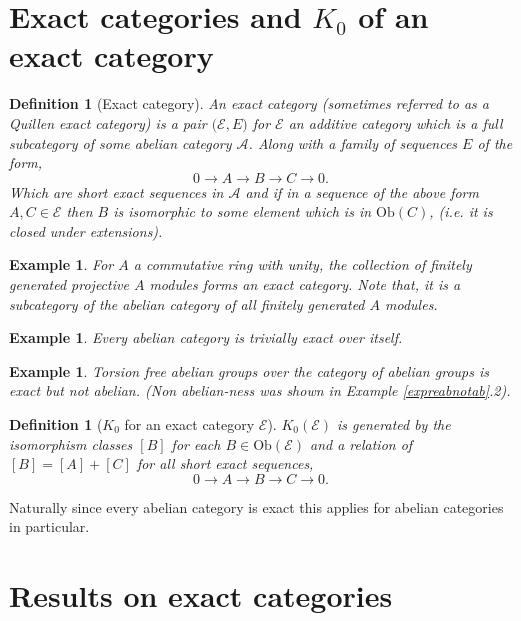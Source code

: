 \documentclass[12pt]{report}
\numberwithin{equation}{section}
\newtheorem{definition}[dummy]{Definition}
\newtheorem{example}[dummy]{Example}
\begin{document}
	\section{Exact categories and \( K_0 \) of an exact category}
	\begin{definition}[Exact category]\label{defexactcat}
			An exact category (sometimes referred to as a Quillen exact category) is a pair $\mathcal{(E},E)$ for $\mathcal{E}$ an additive category which is a full subcategory of some abelian category $\mathcal{A}$. Along with a family of sequences $E$ of the form, \[ 0 \to A \to B \to C \to 0. \] Which are short exact sequences in $\mathcal{A}$ and if in a sequence of the above form $A, C \in \mathcal{E}$ then $B $ is isomorphic to some element which is in $\mathrm{Ob}(C)$, (i.e. it is closed under extensions).
	\end{definition}
	\begin{example}
			For \(A\) a commutative ring with unity, the collection of finitely generated projective \( A \) modules forms an exact category. Note that, it is a subcategory of the abelian category of all finitely generated \( A \) modules.
	\end{example}
	\begin{example}
			Every abelian category is trivially exact over itself.
	\end{example}
	\begin{example}Torsion free abelian groups over the category of abelian groups is exact but not abelian. (Non abelian-ness was shown in Example \ref{expreabnotab}.2).
	\end{example}
		
	\begin{definition}[$K_0$ for an exact category $\mathcal{E}$]\label{def:k0exact}
			$K_0(\mathcal E)$ is generated by the isomorphism classes $[B]$ for each $B \in \mathrm{Ob}(\mathcal{E})$ and a relation of $[B]=[A]+[C]$ for all short exact sequences, \[ 0 \to A \to B \to C \to 0.\]
	\end{definition}
		
	Naturally since every abelian category is exact this applies for abelian categories in particular.		
		
	\section{Results on exact categories}
			
\end{document}
